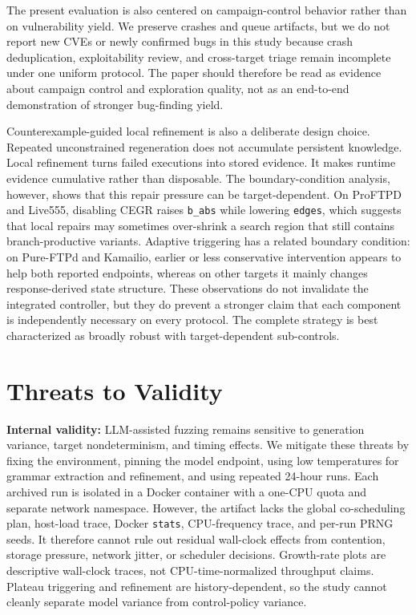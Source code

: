 \documentclass[final,5p,times,number]{elsarticle}
\begin{document}
The present evaluation is also centered on campaign-control behavior rather than on vulnerability yield. We preserve crashes and queue artifacts, but we do not report new CVEs or newly confirmed bugs in this study because crash deduplication, exploitability review, and cross-target triage remain incomplete under one uniform protocol. The paper should therefore be read as evidence about campaign control and exploration quality, not as an end-to-end demonstration of stronger bug-finding yield.

Counterexample-guided local refinement is also a deliberate design choice. Repeated unconstrained regeneration does not accumulate persistent knowledge. Local refinement turns failed executions into stored evidence. It makes runtime evidence cumulative rather than disposable. The boundary-condition analysis, however, shows that this repair pressure can be target-dependent. On ProFTPD and Live555, disabling CEGR raises \texttt{b\_abs} while lowering \texttt{edges}, which suggests that local repairs may sometimes over-shrink a search region that still contains branch-productive variants. Adaptive triggering has a related boundary condition: on Pure-FTPd and Kamailio, earlier or less conservative intervention appears to help both reported endpoints, whereas on other targets it mainly changes response-derived state structure. These observations do not invalidate the integrated controller, but they do prevent a stronger claim that each component is independently necessary on every protocol. The complete strategy is best characterized as broadly robust with target-dependent sub-controls.

\section{Threats to Validity}
\label{sec:threats}

\textbf{Internal validity:} LLM-assisted fuzzing remains sensitive to generation variance, target nondeterminism, and timing effects. We mitigate these threats by fixing the environment, pinning the model endpoint, using low temperatures for grammar extraction and refinement, and using repeated 24-hour runs. Each archived run is isolated in a Docker container with a one-CPU quota and separate network namespace. However, the artifact lacks the global co-scheduling plan, host-load trace, Docker \texttt{stats}, CPU-frequency trace, and per-run PRNG seeds. It therefore cannot rule out residual wall-clock effects from contention, storage pressure, network jitter, or scheduler decisions. Growth-rate plots are descriptive wall-clock traces, not CPU-time-normalized throughput claims. Plateau triggering and refinement are history-dependent, so the study cannot cleanly separate model variance from control-policy variance.
\end{document}
